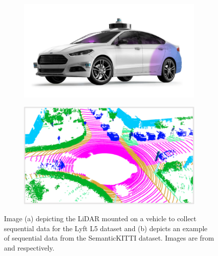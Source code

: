     \begin{figure}[h!]
        \begin{subfigure}{0.45\textwidth}
            \centering
            \includegraphics[scale=0.25]{images/sequential_lyft.png}
            \caption{}
            \label{fig:seq_data_lyft}
        \end{subfigure}
        \begin{subfigure}{0.45\textwidth}
            \centering
            \includegraphics[scale=0.45]{images/SemanticKitti.pdf}
            \caption{}
            \label{fig:example_sequential}
        \end{subfigure}
        \caption{Image (a) depicting the LiDAR mounted on a vehicle to collect sequential data for the Lyft L5 dataset and 
        (b) depicts an example of sequential data from the SemanticKITTI dataset. Images are from \cite{Lyftl5} and \cite{Hu_2020_CVPR_Randla} respectively.}
        
    \end{figure}
    
